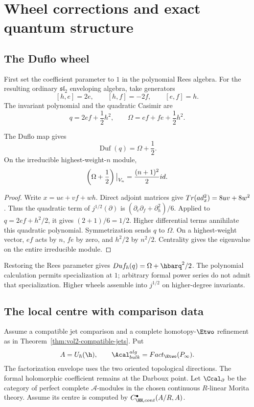 \part{Wheel corrections and exact quantum structure}

\chapter{The Duflo wheel}
First set the coefficient parameter to $1$ in the polynomial Rees algebra.
For the resulting ordinary $\mathfrak{sl}_2$ enveloping algebra, take generators
\[
 [h,e]=2e,
 \qquad
 [h,f]=-2f,
 \qquad
 [e,f]=h.
\]
The invariant polynomial and the quadratic Casimir are
\[
 q=2ef+\frac12h^2,
 \qquad
 \Omega=ef+fe+\frac12h^2.
\]

\begin{calculation}
The Duflo map gives
\[
 \operatorname{Duf}(q)=\Omega+\frac12.
\]
On the irreducible highest-weight-$n$ module,
\[
 \left(\Omega+\frac12\right)\big|_{V_n}
 =\frac{(n+1)^2}{2}id.
\]
\end{calculation}
\begin{proof}
Write $x=ue+vf+wh$.  Direct adjoint matrices give
$Tr(ad_x^2)=8uv+8w^2$.
Thus the quadratic term of $j^{1/2}(\partial)$ is
$(\partial_e\partial_f+\partial_h^2)/6$.
Applied to $q=2ef+h^2/2$, it gives $(2+1)/6=1/2$.
Higher differential terms annihilate this quadratic polynomial.
Symmetrization sends $q$ to $\Omega$.
On a highest-weight vector, $ef$ acts by $n$, $fe$ by zero,
and $h^2/2$ by $n^2/2$.
Centrality gives the eigenvalue on the entire irreducible module.
\end{proof}

Restoring the Rees parameter gives $\operatorname{Duf}_\hbar(q)=\Omega+\hbarq^2/2$.  The polynomial calculation permits specialization at $1$; arbitrary formal power series do not admit that specialization.  Higher wheels assemble into $j^{1/2}$ on higher-degree invariants.

\chapter{The local centre with comparison data}
Assume a compatible jet comparison and a complete homotopy-$\Etwo$
refinement as in Theorem~\ref{thm:vol2-compatible-jets}.
Put
\[
 \mathcal A=\widehat U_\hbar(\h),\qquad
 \Acal_{\mathrm{bulk}}^{\mathrm{alg}}
 =\operatorname{Fact}_{\Etwo}(\mathcal P_\infty).
\]
The factorization envelope uses the two oriented topological directions.
The formal holomorphic coefficient remains at the Darboux point.
Let $\Ccal_\partial$ be the category of perfect complete $\mathcal A$-modules
in the chosen continuous $R$-linear Morita theory.
Assume its centre is computed by
$C^\bullet_{\HH,\mathrm{cont}}(\mathcal A/R,\mathcal A)$.


